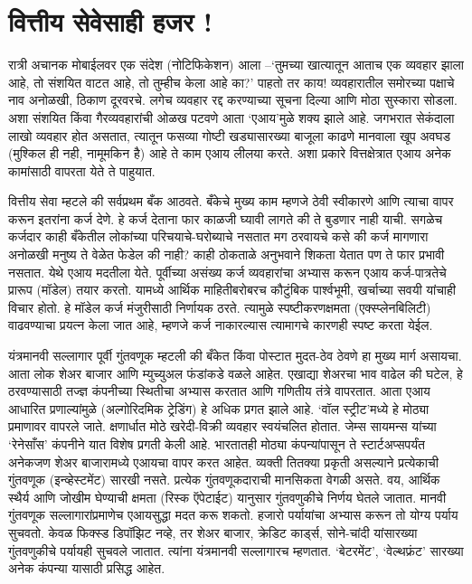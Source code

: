 \chapter{वित्तीय सेवेसाही हजर !}

रात्री अचानक मोबाईलवर एक संदेश (नोटिफिकेशन) आला –‘तुमच्या खात्यातून आताच एक व्यवहार झाला आहे, तो संशयित वाटत आहे, तो तुम्हीच केला आहे का?’ पाहतो तर काय! व्यवहारातील समोरच्या पक्षाचे नाव अनोळखी, ठिकाण दूरवरचे. लगेच व्यवहार रद्द करण्याच्या सूचना दिल्या आणि मोठा सुस्कारा सोडला. अशा संशयित किंवा गैरव्यवहारांची ओळख पटवणे आता ‘एआय’मुळे शक्य झाले आहे. जगभरात सेकंदाला लाखो व्यवहार होत असतात, त्यातून फसव्या गोष्टी खड्यासारख्या बाजूला काढणे मानवाला खूप अवघड (मुश्किल ही नही, नामूमकिन है) आहे ते काम एआय लीलया करते. अशा प्रकारे वित्तक्षेत्रात एआय अनेक कामांसाठी वापरता येते ते पाहुयात.

वित्तीय सेवा म्हटले की सर्वप्रथम बँक आठवते. बँकेचे मुख्य काम म्हणजे ठेवी स्वीकारणे आणि त्याचा वापर करून इतरांना कर्ज देणे. हे कर्ज देताना फार काळजी घ्यावी लागते की ते बुडणार नाही याची. सगळेच कर्जदार काही बँकेतील लोकांच्या परिचयाचे-घरोब्याचे नसतात मग ठरवायचे कसे की कर्ज मागणारा अनोळखी मनुष्य ते वेळेत फेडेल की नाही? काही ठोकताळे अनुभवाने शिकता येतात पण ते फार प्रभावी नसतात. येथे एआय मदतीला येते. पूर्वीच्या असंख्य कर्ज व्यवहारांचा अभ्यास करून एआय कर्ज-पात्रतेचे प्रारूप (मॉडेल) तयार करतो. यामध्ये आर्थिक माहितीबरोबरच कौटुंबिक पार्श्वभूमी, खर्चाच्या सवयी यांचाही विचार होतो. हे मॉडेल कर्ज मंजुरीसाठी निर्णायक ठरते. त्यामुळे स्पष्टीकरणक्षमता (एक्स्प्लेनबिलिटी) वाढवण्याचा प्रयत्न केला जात आहे, म्हणजे कर्ज नाकारल्यास त्यामागचे कारणही स्पष्ट करता येईल.

यंत्रमानवी सल्लागार
पूर्वी गुंतवणूक म्हटली की बँकेत किंवा पोस्टात मुदत-ठेव ठेवणे हा मुख्य मार्ग असायचा. आता लोक शेअर बाजार आणि म्युच्युअल फंडांकडे वळले आहेत. एखाद्या शेअरचा भाव वाढेल की घटेल, हे ठरवण्यासाठी तज्ज्ञ कंपनीच्या स्थितीचा अभ्यास करतात आणि गणितीय तंत्रे वापरतात. आता एआय आधारित प्रणाल्यांमुळे (अल्गोरिदमिक ट्रेडिंग) हे अधिक प्रगत झाले आहे. ‘वॉल स्ट्रीट’मध्ये हे मोठ्या प्रमाणावर वापरले जाते. क्षणार्धात मोठे खरेदी-विक्री व्यवहार स्वयंचलित होतात. जेम्स सायमन्स यांच्या ‘रेनेसाँस’ कंपनीने यात विशेष प्रगती केली आहे. भारतातही मोठ्या कंपन्यांपासून ते स्टार्टअप्सपर्यंत अनेकजण शेअर बाजारामध्ये एआयचा वापर करत आहेत. व्यक्ती तितक्या प्रकृती असल्याने प्रत्येकाची गुंतवणूक (इन्व्हेस्टमेंट) सारखी नसते. प्रत्येक गुंतवणूकदाराची मानसिकता वेगळी असते. वय, आर्थिक स्थैर्य आणि जोखीम घेण्याची क्षमता (रिस्क ऍपेटाईट) यानुसार गुंतवणुकीचे निर्णय घेतले जातात. मानवी गुंतवणूक सल्लागारांप्रमाणेच एआयसुद्धा मदत करू शकतो. हजारो पर्यायांचा अभ्यास करून तो योग्य पर्याय सुचवतो. केवळ फिक्स्ड डिपॉझिट नव्हे, तर शेअर बाजार, क्रेडिट कार्ड्स, सोने-चांदी यांसारख्या गुंतवणुकीचे पर्यायही सुचवले जातात. त्यांना यंत्रमानवी सल्लागारच म्हणतात. ‘बेटरमेंट’, ‘वेल्थफ्रंट’ सारख्या अनेक कंपन्या यासाठी प्रसिद्ध आहेत.

